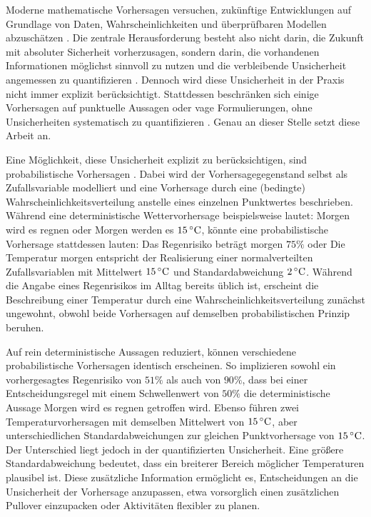 Moderne mathematische Vorhersagen versuchen, zukünftige Entwicklungen auf Grundlage von Daten, Wahrscheinlichkeiten und überprüfbaren Modellen abzuschätzen \parencite{prediction}. Die zentrale Herausforderung besteht also nicht darin, die Zukunft mit absoluter Sicherheit vorherzusagen, sondern darin, die vorhandenen Informationen möglichst sinnvoll zu nutzen und die verbleibende Unsicherheit angemessen zu quantifizieren \parencite{wilks,gneiting2014probabilistic}. Dennoch wird diese Unsicherheit in der Praxis nicht immer explizit berücksichtigt. Stattdessen beschränken sich einige Vorhersagen auf punktuelle Aussagen oder vage Formulierungen, ohne Unsicherheiten systematisch zu quantifizieren \parencite{gneiting2014probabilistic}. Genau an dieser Stelle setzt diese Arbeit an.

Eine Möglichkeit, diese Unsicherheit explizit zu berücksichtigen, sind probabilistische Vorhersagen \parencite{gneiting2014probabilistic}. Dabei wird der Vorhersagegegenstand selbst als Zufallsvariable modelliert und eine Vorhersage durch eine (bedingte) Wahrscheinlichkeitsverteilung anstelle eines einzelnen Punktwertes beschrieben. Während eine deterministische Wettervorhersage beispielsweise lautet: \glqq Morgen wird es regnen\grqq{} oder \glqq Morgen werden es $15\,^\circ\mathrm{C}$\grqq{}, könnte eine probabilistische Vorhersage stattdessen lauten: \glqq Das Regenrisiko beträgt morgen $75\%$\grqq{} oder \glqq Die Temperatur morgen entspricht der Realisierung einer normalverteilten Zufallsvariablen mit Mittelwert $15\,^\circ\mathrm{C}$ und Standardabweichung $2\,^\circ\mathrm{C}$\grqq{}. Während die Angabe eines Regenrisikos im Alltag bereits üblich ist, erscheint die Beschreibung einer Temperatur durch eine Wahrscheinlichkeitsverteilung zunächst ungewohnt, obwohl beide Vorhersagen auf demselben probabilistischen Prinzip beruhen.

Auf rein deterministische Aussagen reduziert, können verschiedene probabilistische Vorhersagen identisch erscheinen. So implizieren sowohl ein vorhergesagtes Regenrisiko von $51\%$ als auch von $90\%$, dass bei einer Entscheidungsregel mit einem Schwellenwert von $50\%$ die deterministische Aussage \glqq Morgen wird es regnen\grqq{} getroffen wird. Ebenso führen zwei Temperaturvorhersagen mit demselben Mittelwert von $15\,^\circ\mathrm{C}$, aber unterschiedlichen Standardabweichungen zur gleichen Punktvorhersage von $15\,^\circ\mathrm{C}$. Der Unterschied liegt jedoch in der quantifizierten Unsicherheit. Eine größere Standardabweichung bedeutet, dass ein breiterer Bereich möglicher Temperaturen plausibel ist. Diese zusätzliche Information ermöglicht es, Entscheidungen an die Unsicherheit der Vorhersage anzupassen, etwa vorsorglich einen zusätzlichen Pullover einzupacken oder Aktivitäten flexibler zu planen.

